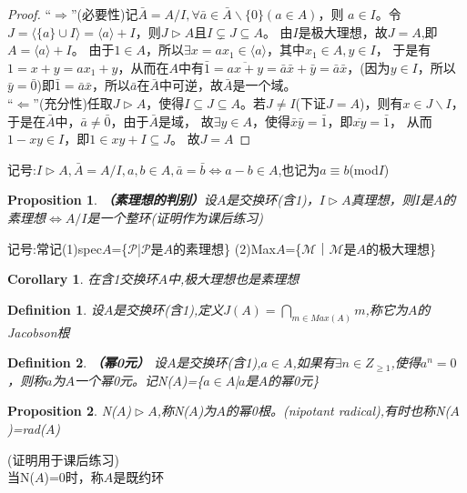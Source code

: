 \documentclass[UTF8]{article}
\newtheorem{defn}{Definition}[section]
\newtheorem{cor}{Corollary}[section]
\newtheorem{prop}{Proposition}[section]
\begin{document}
\begin{proof}
	“$\Rightarrow$”(必要性)记$\bar A=A/I,\forall\bar a\in\bar A\backslash \{0\}(a\in A)$，则
	$a\in I$。令$J=\langle\{a\}\cup I\rangle=\langle a\rangle+I$，则$J\vartriangleright A$且$I\subsetneq J\subseteq A$。
	由$I$是极大理想，故$J=A$,即$A=\langle a\rangle+I$。
	由于$1\in A$，所以$\exists x=ax_1\in\langle a\rangle$，其中$x_1\in A,y\in I$，
	于是有$1=x+y=ax_1+y$，从而在$A$中有$\bar 1=\overline{ax+y}=\bar a\bar x+\bar y=\bar a\bar x$，(因为$y\in I$，所以$\bar y=\bar0$)即$\bar1=\bar a\bar x$，所以$\bar a$在$\bar A$中可逆，故$\bar A$是一个域。
	\\“$\Leftarrow$”(充分性)任取$J\vartriangleright A$，使得$I\subseteq J\subseteq A$。若$J\neq I$(下证$J=A$)，则有$x\in J\backslash I$，于是在$\bar A$中，$\bar a\neq\bar 0$，由于$\bar A$是域，
	故$\exists y\in A$，使得$\bar x\bar y=\bar1$，即$\overline{xy}=\bar1$，
	从而${1-xy}\in I$，即$1\in {xy+I}\subseteq J$。
	故$J=A$
\end{proof}
记号:$I\vartriangleright A,\bar A=A/I,a,b\in A,\bar a=\bar b\Longleftrightarrow a-b\in A$,也记为$a\equiv b$(mod$I$)

\begin{prop}
	\textbf{（素理想的判别）}设$A$是交换环(含1)，$I\vartriangleright A$真理想，则$I$是$A$的素理想$\Longleftrightarrow A/I$是一个整环(证明作为课后练习)
\end{prop}

记号:常记(1)spec$A$=\{$\mathcal P$|$\mathcal P$是$A$的素理想\}
(2)Max$A$=\{$\mathcal M$｜$\mathcal M$是$A$的极大理想\}

\begin{cor}
	在含1交换环$A$中,极大理想也是素理想
\end{cor}

\begin{defn}
	设$A$是交换环(含1),定义$J(A)=\bigcap_{m\in Max(A)}m$,称它为$A$的Jacobson根
\end{defn}

\begin{defn}
	\textbf{（幂0元）}
	设$A$是交换环(含1),$a\in A$,如果有$\exists n\in Z_{\geq 1}$,使得$a^n=0$，则称$a$为$A$一个幂0元。记N($A$)=\{$a\in A$|$a$是$A$的幂0元\}
\end{defn}

\begin{prop}
	N($A$)$\vartriangleright A$,称N($A$)为$A$的幂0根。(nipotant radical),有时也称N($A$)=rad($A$)
\end{prop}
(证明用于课后练习)
\\当N($A$)=0时，称$A$是既约环
\end{document}

